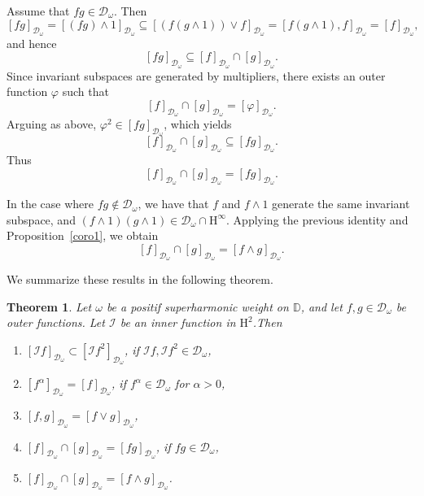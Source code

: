 \documentclass[12pt,reqno,a4paper]{amsart}
\newtheorem{theo}[prop]{Theorem}
\newcommand{\kH}{\mathrm{H^\infty  }}
\newcommand{\hH}{\mathrm{H^2 }}
\newcommand\DD{\mathbb{D}}
\newcommand{\cD}{{\mathcal{D}}}
\numberwithin{equation}{section}
\begin{document}
	Assume that $fg \in \mathcal{D}_\omega$. Then
	\[
	[fg]_{\mathcal{D}_\omega}
	= [(fg)\wedge 1]_{\mathcal{D}_\omega}
	\subseteq [(f(g \wedge 1)) \vee f]_{\mathcal{D}_\omega}
	= [f(g \wedge 1), f]_{\mathcal{D}_\omega}
	= [f]_{\mathcal{D}_\omega},
	\]
	and hence
	\[
	[fg]_{\mathcal{D}_\omega} \subseteq [f]_{\mathcal{D}_\omega} \cap [g]_{\mathcal{D}_\omega}.
	\]
	Since invariant subspaces are generated by multipliers, there exists an outer function $\varphi$ such that
	\[
	[f]_{\mathcal{D}_\omega} \cap [g]_{\mathcal{D}_\omega} = [\varphi]_{\mathcal{D}_\omega}.
	\]
	Arguing as above, $\varphi^2 \in [fg]_{\mathcal{D}_\omega}$, which yields
	\[
	[f]_{\mathcal{D}_\omega} \cap [g]_{\mathcal{D}_\omega} \subseteq [fg]_{\mathcal{D}_\omega}.
	\]
	Thus
	\[
	[f]_{\mathcal{D}_\omega} \cap [g]_{\mathcal{D}_\omega} = [fg]_{\mathcal{D}_\omega}.
	\]
	
	In the case where $fg \notin \mathcal{D}_\omega$, we have that $f$ and $f \wedge 1$ generate the same invariant subspace, and $(f \wedge 1)(g \wedge 1) \in \mathcal{D}_\omega \cap \kH$. Applying the previous identity and Proposition~\ref{coro1}, we obtain
	\[
	[f]_{\mathcal{D}_\omega} \cap [g]_{\mathcal{D}_\omega} = [f \wedge g]_{\mathcal{D}_\omega}.
	\]
	
	We summarize these results in the following theorem.
	\begin{theo}\label{genspace}
		Let $\omega$ be a positif superharmonic weight on $\DD$, and let $f,g \in\cD_\omega$ be outer functions. Let $\mathcal{I}$ be an inner function in $\hH$.Then 
		
		\begin{enumerate}
			\item[A.] $ [\mathcal{I}f]_{\cD_\omega}\subset [\mathcal{I}f^2]_{\cD_\omega}$, if $\mathcal{I}f,\mathcal{I}f^2\in\cD_\omega$,	\\
			\item[B.] $[f^{\alpha}]_{\cD_\omega}=[f]_{\cD_\omega}$, if $f^{\alpha}\in \cD_\omega$ for $\alpha>0$,\\
			\item[C.] $[f,g]_{\cD_\omega}=[f\vee g]_{\cD_\omega}$,\\
			\item[D.] $[f]_{\cD_\omega}\cap [g]_{\cD_\omega}=[fg]_{\cD_\omega}$, if  $fg\in\cD_\omega$, \\
			\item[E.] $[f]_{\cD_\omega}\cap [g]_{\cD_\omega}=[f\wedge g]_{\cD_\omega}$.
			
		\end{enumerate}
	\end{theo}
\end{document}

